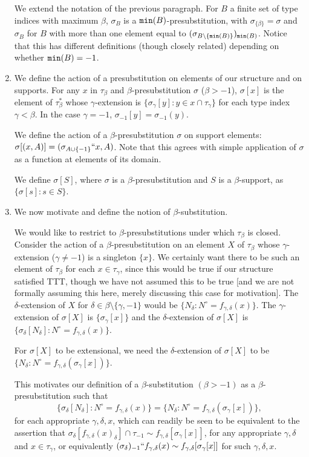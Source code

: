 \documentclass[12pt]{article}
\begin{document}
\begin{enumerate}
We extend the notation of the previous paragraph.   For $B$ a finite set of type indices with maximum $\beta$, $\sigma_B$ is a ${\tt min}(B)$-presubstitution, with $\sigma_{\{\beta\}} = \sigma$ and $\sigma_B$ for $B$ with more than one element
equal to $(\sigma_{B \setminus \{{\tt min}(B)\}})_{{\tt min}(B)}$.  Notice that this has different definitions (though closely related) depending on whether ${\tt min}(B)=-1$.

\item  We define the action of a presubstitution on elements of our structure and on supports.  For any $x$ in $\tau_\beta$ and $\beta$-presubstitution $\sigma$ ($\beta>-1$), $\sigma[x]$ is the element of $\tau^*_\beta$ whose $\gamma$-extension is $\{\sigma_\gamma[y]:y \in x \cap \tau_\gamma\}$ for each type index $\gamma<\beta$.  In
the case $\gamma=-1$, $\sigma_{-1}[y] = \sigma_{-1}(y)$.

We define the action of a $\beta$-presubstitution $\sigma$ on support elements:  $\sigma[(x,A)] = (\sigma_{A \cup \{-1\}}``x,A)$.  Note that this agrees with simple application
of $\sigma$ as a function at elements of  its domain.

We define $\sigma[S]$, where $\sigma$ is a $\beta$-presubstitution and $S$ is a $\beta$-support, as $\{\sigma[s]:s \in S\}$.

\item  We now motivate and define the notion of $\beta$-substitution.

We would like to restrict to $\beta$-presubstitutions under which $\tau_\beta$ is closed.  Consider the action of a $\beta$-presubstitution on an element $X$ of $\tau_\beta$ whose $\gamma$-extension ($\gamma \neq -1$) is a singleton $\{x\}$.  We certainly want there to be such an element of $\tau_\beta$
for each $x \in \tau_\gamma$, since this would be true if our structure satisfied TTT, though we have not assumed this to be true [and we are not formally assuming this here, merely discussing this case for motivation].  The $\delta$-extension of $X$ for $\delta \in \beta \setminus \{\gamma,-1\}$ would be $\{N_\delta:N^\circ = f_{\gamma,\delta}(x)\}$.
The $\gamma$-extension of $\sigma[X]$ is $\{\sigma_\gamma[x]\}$ and the $\delta$-extension of $\sigma[X]$ is $\{\sigma_\delta[N_\delta]:N^\circ = f_{\gamma,\delta}(x)\}$.  

For $\sigma[X]$ to be extensional, we need the $\delta$-extension of $\sigma[X]$ to be $\{N_\delta:N^\circ = f_{\gamma,\delta}(\sigma_\gamma[x])\}$.

This motivates our definition of a $\beta$-substitution $(\beta>-1)$ as a $\beta$-presubstitution such that $$\{\sigma_\delta[N_\delta]:N^\circ = f_{\gamma,\delta}(x)\} = \{N_\delta:N^\circ = f_{\gamma,\delta}(\sigma_\gamma[x])\},$$ for each appropriate $\gamma, \delta,x$, which can readily be seen to be equivalent to the assertion that
$\sigma_\delta[f_{\gamma,\delta}(x)_\delta] \cap \tau_{-1} \sim  f_{\gamma,\delta}[\sigma_\gamma[x]]$, for any appropriate $\gamma, \delta$ and $x \in \tau_\gamma$, or equivalently
$(\sigma_\delta)_{-1}``f_{\gamma,\delta}(x) \sim f_{\gamma,\delta}[\sigma_\gamma[x]]$ for such $\gamma,\delta,x$.


\end{enumerate}
\end{document}
